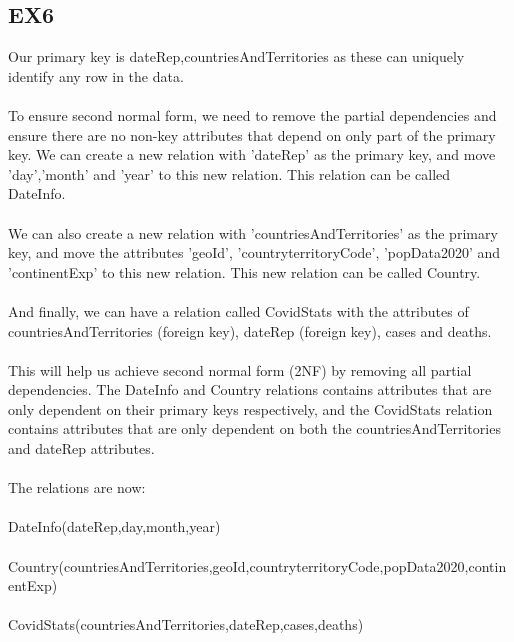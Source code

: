 \documentclass[]{article}
\begin{document}
\subsection {EX6}
Our primary key is dateRep,countriesAndTerritories as these can uniquely identify any row in the data.\\
\\To ensure second normal form, we need to remove the partial dependencies and ensure there are no non-key attributes that depend on only part of the primary key.
We can create a new relation with 'dateRep' as the primary key, and move 'day','month' and 'year' to this new relation. This relation can be called DateInfo.
\\\\
We can also create a new relation with 'countriesAndTerritories' as the primary key, and move the attributes 'geoId', 'countryterritoryCode', 'popData2020' and 'continentExp' to this new relation. This new relation can be called Country.
\\\\
And finally, we can have a relation called CovidStats with the attributes of countriesAndTerritories (foreign key), dateRep (foreign key), cases and deaths.\\
\\This will help us achieve second normal form (2NF) by removing all partial dependencies. The DateInfo and Country relations contains attributes that are only dependent on their primary keys respectively, and the CovidStats relation contains attributes that are only dependent on both the countriesAndTerritories and dateRep attributes.
\\\\The relations are now:\\
\\DateInfo(dateRep,day,month,year)\\
\\Country(countriesAndTerritories,geoId,countryterritoryCode,popData2020,continentExp)\\
\\CovidStats(countriesAndTerritories,dateRep,cases,deaths)\\
\end{document}
